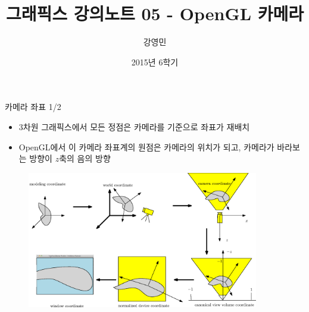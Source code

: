 \documentclass{beamer}
\title[3D 그래픽스 프로그래밍]{그래픽스 강의노트 05 - OpenGL 카메라}
\author{강영민}
\institute{동명대학교}
\date{2015년 6학기}
\begin{document}
\begin{frame}
  \titlepage
\end{frame}




%


\begin{frame}{카메라 좌표 1/2}

\begin{itemize}
\item 3차원 그래픽스에서 모든 정점은 카메라를 기준으로 좌표가 재배치
\item OpenGL에서 이 카메라 좌표계의 원점은 카메라의 위치가 되고, 카메라가 바라보는 방향이 $z$축의 음의 방향
\end{itemize}

\begin{figure}
    \includegraphics[height=6cm]{OGL_camera/coordinatesInPipeline.eps}
\end{figure}

\end{frame}
\end{document}
